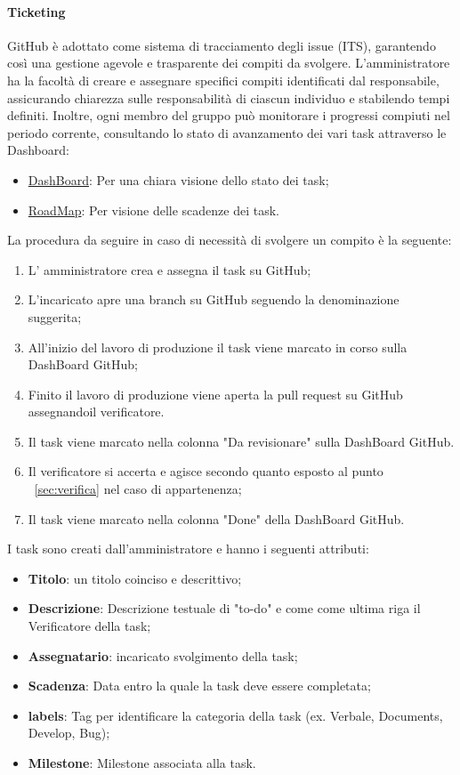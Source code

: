 \documentclass{article}
\begin{document}
        \paragraph{Ticketing}
        GitHub è adottato come sistema di tracciamento degli issue (ITS), garantendo così una gestione agevole e trasparente dei compiti da svolgere. L'amministratore ha la facoltà di creare e assegnare specifici compiti identificati dal responsabile, assicurando chiarezza sulle responsabilità di ciascun individuo e stabilendo tempi definiti. Inoltre, ogni membro del gruppo può monitorare i progressi compiuti nel periodo corrente, consultando lo stato di avanzamento dei vari task attraverso le Dashboard:
        \begin{itemize}
            \item \href{https://github.com/orgs/ByteOps-swe/projects/1}{DashBoard}: Per una chiara visione dello stato dei task;
            \item \href{https://github.com/orgs/ByteOps-swe/projects/3}{RoadMap}: Per visione delle scadenze dei task.
        \end{itemize}
        La procedura da seguire in caso di necessità di svolgere un compito è la seguente:
        \begin{enumerate}
    \item L' amministratore crea e assegna il task su GitHub;
    \item L'incaricato apre una branch su GitHub seguendo la denominazione suggerita;
    \item  All'inizio del lavoro di produzione il task viene marcato in corso sulla DashBoard GitHub;
    \item Finito il lavoro di produzione viene aperta la pull request su GitHub assegnandoil verificatore.
    \item Il task viene marcato nella colonna "Da revisionare" sulla DashBoard GitHub.
    \item Il verificatore si accerta e agisce secondo quanto esposto al punto ~\ref{sec:verifica} nel caso di appartenenza;
    \item Il task viene marcato nella colonna "Done" della DashBoard GitHub.
\end{enumerate}
I task sono creati dall'amministratore e hanno i seguenti attributi:
\begin{itemize}
    \item \textbf{Titolo}: un titolo coinciso e descrittivo;
    \item \textbf{Descrizione}: Descrizione testuale di "to-do" e come come ultima riga il Verificatore della task;
    \item \textbf{Assegnatario}: incaricato svolgimento della task;
    \item \textbf{Scadenza}: Data entro la quale la task deve essere completata;
    \item \textbf{labels}: Tag per identificare la categoria della task (ex. Verbale, Documents, Develop, Bug);
    \item \textbf{Milestone}: Milestone associata alla task.
\end{itemize}
\end{document}
